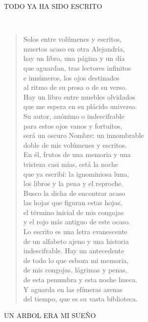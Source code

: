 \documentclass[a4paper, 12pt]{article}
\begin{document}
\centerline{TODO YA HA SIDO ESCRITO}
~
\begin{verse}
    
Solos entre volúmenes y escritos,\\
muertos acaso en otra Alejandría,\\
hay un libro, una página y un día\\
que aguardan, tras lectores infinitos\\
e innúmeros, los ojos destinados\\
al ritmo de su prosa o de su verso.\\
Hay un libro entre muebles olvidados\\
que me espera en su plácido universo.\\
Su autor, anónimo o indescifrable\\
para estos ojos vanos y fortuitos,\\
será un oscuro Nombre: un innombrable\\
doble de mis volúmenes y escritos.\\
En él, frutos de una memoria y una\\
tristeza casi mías, está la noche\\
que ya escribí: la ignominiosa luna,\\
los libros y la pena y el reproche.\\
Busco la dicha de encontrar acaso\\
las hojas que figuran estas hojas,\\
el término inicial de mis congojas\\
y el rojo más antiguo de este ocaso.\\
Lo escrito es una letra evanescente\\
de un alfabeto ajeno y una historia\\
indescifrable. Hay un antecedente\\
de todo lo que esboza mi memoria,\\
de mis congojas, lágrimas y penas,\\
de esta penumbra y esta noche hueca.\\
Y aguarda en las efímeras arenas\\
del tiempo, que es su vasta biblioteca.\\
\end{verse}

\pagebreak
\centerline{UN ARBOL ERA MI SUEÑO}
~
\end{document}

